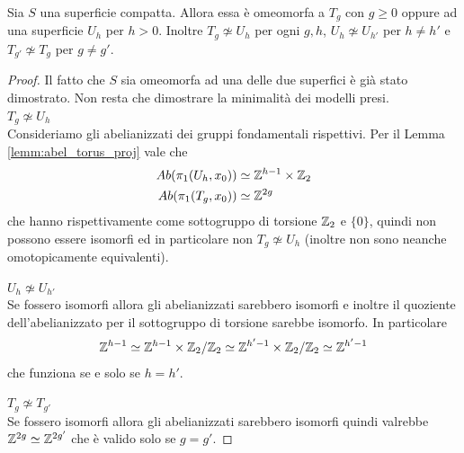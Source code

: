 \begin{theorem}
	Sia $S$ una superficie compatta. Allora essa è omeomorfa a $T_g$ con $g\ge 0$ oppure ad una superficie $U_h$ per $h > 0$. Inoltre $T_g \not\simeq U_h$ per ogni $g,h$, $U_h \not\simeq U_{h'}$ per $h\neq h'$ e $T_{g'} \not\simeq T_g$ per $g \neq g'$.
\end{theorem}
\begin{proof}
	Il fatto che $S$ sia omeomorfa ad una delle due superfici è già stato dimostrato. Non resta che dimostrare la minimalità dei modelli presi.\\
	
	\textbf{$T_g \not\simeq U_h$}\\
	
	Consideriamo gli abelianizzati dei gruppi fondamentali rispettivi. Per il Lemma \ref{lemm:abel_torus_proj} vale che 
	\begin{equation}
	\begin{aligned}
		Ab(\pi_1(U_h, x_0)) & \simeq \mathbb{Z}^{h-1} \times \mathbb{Z}_2 \\
		Ab(\pi_1(T_g, x_0)) & \simeq \mathbb{Z}^{2g}
	\end{aligned}
	\end{equation}
	che hanno rispettivamente come sottogruppo di torsione $\mathbb{Z}_2$ e $\{0\}$, quindi non possono essere isomorfi ed in particolare non $T_g \not\simeq U_h$ (inoltre non sono neanche omotopicamente equivalenti).
	
	\textbf{$U_h \not\simeq U_{h'}$} \\
	
	Se fossero isomorfi allora gli abelianizzati sarebbero isomorfi e inoltre il quoziente dell'abelianizzato per il sottogruppo di torsione sarebbe isomorfo. In particolare 
	\begin{equation}
	\begin{aligned}
		\mathbb{Z}^{h-1} \simeq \mathbb{Z}^{h-1} \times \mathbb{Z}_2 / \mathbb{Z}_2 \simeq \mathbb{Z}^{h'-1} \times \mathbb{Z}_2 / \mathbb{Z}_2 \simeq \mathbb{Z}^{h'-1}
	\end{aligned}
	\end{equation}
	che funziona se e solo se $h = h'$.
	
	\textbf{$T_g \not\simeq T_{g'}$} \\
	
	Se fossero isomorfi allora gli abelianizzati sarebbero isomorfi quindi valrebbe $\mathbb{Z}^{2g} \simeq \mathbb{Z}^{2g'}$ che è valido solo se $g = g'$.
\end{proof}



